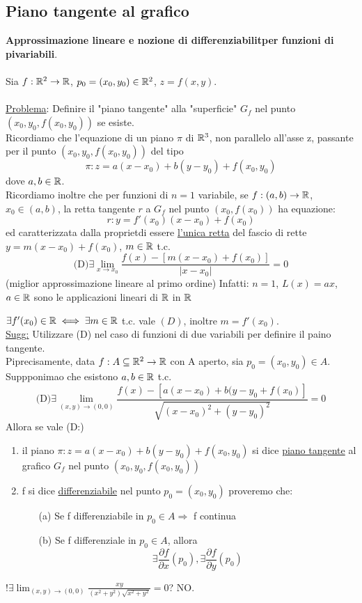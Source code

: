 \subsection{Piano tangente al grafico}
\textbf{Approssimazione lineare e nozione di differenziabilit\aca per funzioni di pi\acu variabili}. \\\\
Sia $f:\mathbb{R}^2 \to \mathbb{R}$, $p_0 = (x_0,y_0) \in \mathbb{R}^2$, $z=f(x,y)$. \\\\
\underline{Problema}: Definire il "piano tangente" alla "superficie" $G_f$ nel punto $(x_0,y_0,f(x_0,y_0))$ se esiste.\\
Ricordiamo che l'equazione di un piano $\pi$ di $\mathbb{R}^3$, non parallelo all'asse z, passante per il punto 
$(x_0,y_0,f(x_0,y_0))$ \ace del tipo 
$$\pi : z = a(x-x_0) + b(y-y_0) + f(x_0,y_0)$$
dove $a,b \in \mathbb{R}$.\\
Ricordiamo inoltre che per funzioni di $n=1$ variabile, se $f:(a,b) \to \mathbb{R}$, $x_0\in (a,b)$, la retta tangente $r$ a 
$G_f$ nel punto $(x_0,f(x_0))$ ha equazione:
$$r: y = f'(x_0)(x-x_0) + f(x_0)$$
ed \ace caratterizzata dalla propriet\aca di essere \underline{l'unica retta} del fascio di rette $y=m(x-x_0)+f(x_0)$, 
$m\in\mathbb{R}$ t.c. 
$$\text{(D)} \exists \lim_{x\to x_0}\frac{f(x)-\left[m(x-x_0)+f(x_0)\right]}{\lvert x-x_0\rvert} = 0$$
(miglior approssimazione lineare al primo ordine)
Infatti: $n=1$, $L(x) = ax$, $a\in\mathbb{R}$ sono le applicazioni lineari di $\mathbb{R}$ in $\mathbb{R}$
\begin{exercise}
  $\exists f'(x_0) \in \mathbb{R} \iff \exists m \in \mathbb{R}$ t.c. vale $(D)$, inoltre $m = f'(x_0)$. \\
  \underline{Sugg:} Utilizzare (D) nel caso di funzioni di due variabili per definire il paino tangente. \\
  Pi\acu precisamente, data $f: A \subseteq \mathbb{R}^2 \to \mathbb{R}$ con A aperto, sia $p_0=(x_0,y_0)\in A$. Suppponimao che esistono $a,b \in \mathbb{R}$ t.c.
  $$\text{(D)} \exists \lim_{(x,y)\to (0,0)}\frac{f(x)-\left[a(x-x_0)+b(y-y_0+f(x_0)\right]}{\sqrt{(x-x_0)^2+(y-y_0)^2}} = 0$$
  Allora se vale (D:)
\end{exercise}
\begin{definition}
  \begin{enumerate}
    \item il piano $\pi : z = a(x-x_0)+b(y-y_0)+f(x_0,y_0)$ si dice \underline{piano tangente} al grafico $G_f$ nel punto $\left(x_0,y_0,f(x_0,y_0)\right)$
    \item f si dice \underline{differenziabile} nel punto $p_0 = (x_0,y_0)$ proveremo che:
      \begin{enumerate}
        \item[(a)] Se f \ace differenziabile in $p_0 \in A \Rightarrow $ f \ace continua
        \item[(b)] Se f \ace differenziale in $p_0 \in A$, allora 
                   $$\exists \frac{\partial f}{\partial x}(p_0), \exists \frac{\partial f}{\partial y}(p_0)$$   
      \end{enumerate}
  \end{enumerate}
\end{definition}
\begin{exercise}
  $!\exists \lim_{(x,y) \to (0,0)} \frac{xy}{(x^2+y^2)\sqrt{x^2+y^2}} = 0$? NO.
\end{exercise}